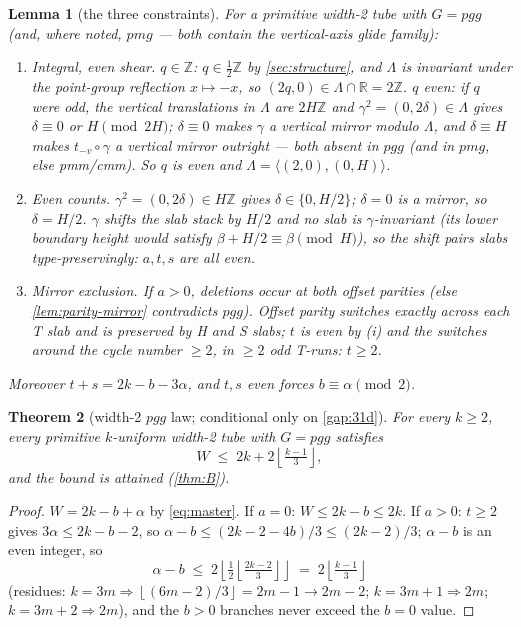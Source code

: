 \documentclass[11pt,a4paper,oneside]{article}
\theoremstyle{plain}
\newtheorem{theorem}{Theorem}[section]
\newtheorem{lemma}[theorem]{Lemma}
\theoremstyle{definition}
\theoremstyle{remark}
\newcommand{\ZZ}{\mathbb{Z}}
\newcommand{\RR}{\mathbb{R}}
\newcommand{\fl}[1]{\left\lfloor #1 \right\rfloor}
\newcommand{\ceilw}{2k + 2\fl{\tfrac{k-1}{3}}}
\begin{document}
\begin{lemma}[the three constraints]\label{lem:constraints}
For a primitive width-2 tube with $G = pgg$ (and, where noted, $pmg$ --- both contain the
vertical-axis glide family):
\begin{enumerate}[label=(\roman*),nosep]
\item[(iii)] \emph{Integral, even shear.} $q \in \ZZ$: $q \in \tfrac12\ZZ$ by
\cref{sec:structure}, and $\Lambda$ is invariant under the point-group reflection
$x \mapsto -x$, so $(2q, 0) \in \Lambda \cap \RR = 2\ZZ$. $q$ even: if $q$ were odd, the
vertical translations in $\Lambda$ are $2H\ZZ$ and $\gamma^2 = (0, 2\delta) \in \Lambda$
gives $\delta \equiv 0$ or $H \pmod{2H}$; $\delta \equiv 0$ makes $\gamma$ a vertical
mirror modulo $\Lambda$, and $\delta \equiv H$ makes $t_{-v}\circ\gamma$ a vertical mirror
outright --- both absent in $pgg$ (and in $pmg$, else pmm/cmm). So $q$ is even and
$\Lambda = \langle(2,0),(0,H)\rangle$.
\item[(i)] \emph{Even counts.} $\gamma^2 = (0, 2\delta) \in H\ZZ$ gives $\delta \in \{0,
H/2\}$; $\delta = 0$ is a mirror, so $\delta = H/2$. $\gamma$ shifts the slab stack by
$H/2$ and no slab is $\gamma$-invariant (its lower boundary height would satisfy $\beta +
H/2 \equiv \beta \pmod H$), so the shift pairs slabs type-preservingly: $a, t, s$ are all
even.
\item[(ii)] \emph{Mirror exclusion.} If $a > 0$, deletions occur at both offset parities
(else \cref{lem:parity-mirror} contradicts $pgg$). Offset parity switches exactly across
each T slab and is preserved by H and S slabs; $t$ is even by (i) and the switches around
the cycle number $\ge 2$, in $\ge 2$ odd T-runs: $t \ge 2$.
\end{enumerate}
Moreover $t + s = 2k - b - 3\alpha$, and $t, s$ even forces $b \equiv \alpha \pmod 2$.
\end{lemma}

\begin{theorem}[width-2 $pgg$ law; conditional only on \cref{gap:31d}]\label{thm:A}
For every $k \ge 2$, every primitive $k$-uniform width-2 tube with $G = pgg$ satisfies
\[
W \;\le\; \ceilw,
\]
and the bound is attained (\cref{thm:B}).
\end{theorem}
\begin{proof}
$W = 2k - b + \alpha$ by \cref{eq:master}. If $a = 0$: $W \le 2k - b \le 2k$. If $a > 0$:
$t \ge 2$ gives $3\alpha \le 2k - b - 2$, so $\alpha - b \le (2k - 2 - 4b)/3 \le (2k-2)/3$;
$\alpha - b$ is an even integer, so
\[
\alpha - b \;\le\; 2\fl{\tfrac{1}{2}\fl{\tfrac{2k-2}{3}}} \;=\; 2\fl{\tfrac{k-1}{3}}
\]
(residues: $k = 3m \Rightarrow \fl{(6m-2)/3} = 2m{-}1 \to 2m{-}2$; $k = 3m{+}1 \Rightarrow
2m$; $k = 3m{+}2 \Rightarrow 2m$), and the $b > 0$ branches never exceed the $b = 0$ value.
\end{proof}
\end{document}
